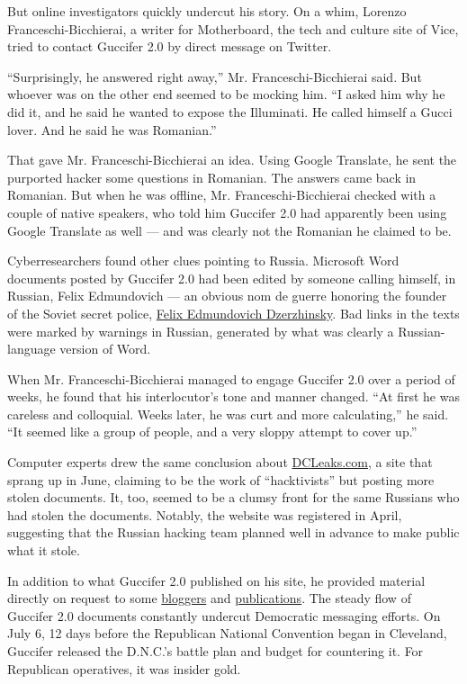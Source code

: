 But online investigators quickly undercut his story. On a whim, Lorenzo
Franceschi-Bicchierai, a writer for Motherboard, the tech and culture
site of Vice, tried to contact Guccifer 2.0 by direct message on
Twitter.

``Surprisingly, he answered right away,'' Mr. Franceschi-Bicchierai
said. But whoever was on the other end seemed to be mocking him. ``I
asked him why he did it, and he said he wanted to expose the Illuminati.
He called himself a Gucci lover. And he said he was Romanian.''

That gave Mr. Franceschi-Bicchierai an idea. Using Google Translate, he
sent the purported hacker some questions in Romanian. The answers came
back in Romanian. But when he was offline, Mr. Franceschi-Bicchierai
checked with a couple of native speakers, who told him Guccifer 2.0 had
apparently been using Google Translate as well --- and was clearly not
the Romanian he claimed to be.

Cyberresearchers found other clues pointing to Russia. Microsoft Word
documents posted by Guccifer 2.0 had been edited by someone calling
himself, in Russian, Felix Edmundovich --- an obvious nom de guerre
honoring the founder of the Soviet secret police,
\href{http://www.newworldencyclopedia.org/entry/Felix_Dzerzhinsky}{Felix
Edmundovich Dzerzhinsky}. Bad links in the texts were marked by warnings
in Russian, generated by what was clearly a Russian-language version of
Word.

When Mr. Franceschi-Bicchierai managed to engage Guccifer 2.0 over a
period of weeks, he found that his interlocutor's tone and manner
changed. ``At first he was careless and colloquial. Weeks later, he was
curt and more calculating,'' he said. ``It seemed like a group of
people, and a very sloppy attempt to cover up.''

Computer experts drew the same conclusion about
\href{http://dcleaks.com/}{DCLeaks.com}, a site that sprang up in June,
claiming to be the work of ``hacktivists'' but posting more stolen
documents. It, too, seemed to be a clumsy front for the same Russians
who had stolen the documents. Notably, the website was registered in
April, suggesting that the Russian hacking team planned well in advance
to make public what it stole.

In addition to what Guccifer 2.0 published on his site, he provided
material directly on request to some
\href{http://hellofla.com/2016/08/12/guccifer-2-0-strikes-fl-18/}{bloggers}
and
\href{https://theintercept.com/2016/10/09/exclusive-new-email-leak-reveals-clinton-campaigns-cozy-press-relationship/}{publications}.
The steady flow of Guccifer 2.0 documents constantly undercut Democratic
messaging efforts. On July 6, 12 days before the Republican National
Convention began in Cleveland, Guccifer released the D.N.C.'s battle
plan and budget for countering it. For Republican operatives, it was
insider gold.

